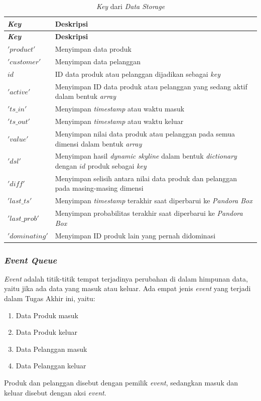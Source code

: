 \begin{longtable}{| p{2.5cm} | p{6.5cm} |}
	\caption{\textit{Key} dari \textit{Data Storage} \label{tab:desc-key}}\\
	\hline
	\textbf{\textit{Key}} & \textbf{Deskripsi} \\ \hline 
	\endfirsthead
	\hline
	\textbf{\textit{Key}} & \textbf{Deskripsi} \\ \hline 
	\endhead
	$'product'$ & Menyimpan data produk \\ \hline
	$'customer'$ & Menyimpan data pelanggan \\ \hline
	$id$ & ID data produk atau pelanggan dijadikan sebagai \textit{key} \\ \hline
	$'active'$ & Menyimpan ID data produk atau pelanggan yang sedang aktif dalam bentuk \textit{array} \\ \hline
	$'ts\_in'$ & Menyimpan \textit{timestamp} atau waktu masuk \\ \hline
	$'ts\_out'$ & Menyimpan \textit{timestamp} atau waktu keluar \\ \hline
	$'value'$ & Menyimpan nilai data produk atau pelanggan pada semua dimensi dalam bentuk \textit{array}\\ \hline
	$'dsl'$ & Menyimpan hasil \textit{dynamic skyline} dalam bentuk \textit{dictionary} dengan $id$ produk sebagai \textit{key}\\ \hline
	$'diff'$ & Menyimpan selisih antara nilai data produk dan pelanggan pada masing-masing dimensi \\ \hline
	$'last\_ts'$ & Menyimpan \textit{timestamp} terakhir saat diperbarui ke \textit{Pandora Box}\\ \hline
	$'last\_prob'$ & Menyimpan probabilitas terakhir saat diperbarui ke \textit{Pandora Box}\\ \hline
	$'dominating'$ & Menyimpan ID produk lain yang pernah didominasi\\ \hline
\end{longtable}

\subsubsection{\textit{Event Queue}}
\tab \textit{Event} adalah titik-titik tempat terjadinya perubahan di dalam himpunan data, yaitu jika ada data yang masuk atau keluar. Ada empat jenis \textit{event} yang terjadi dalam Tugas Akhir ini, yaitu:

\begin{enumerate}
	\item Data Produk masuk
	\item Data Produk keluar
	\item Data Pelanggan masuk
	\item Data Pelanggan keluar
\end{enumerate}
Produk dan pelanggan disebut dengan pemilik \textit{event}, sedangkan masuk dan keluar disebut dengan aksi \textit{event}.

